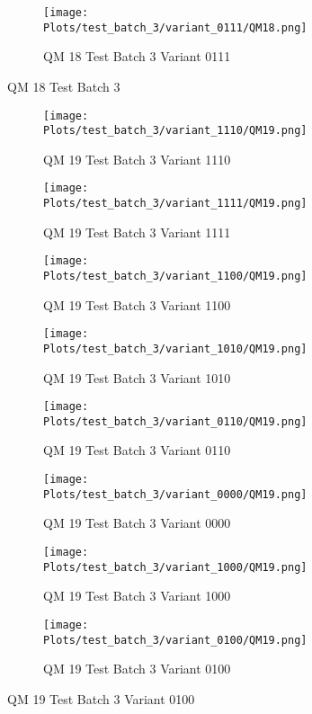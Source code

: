 \documentclass{DissertateFigs}
\begin{document}
\begin{figure}[t!]
\medskip

    \begin{subfigure}{0.47\textwidth}
    \texttt{[image: Plots/test\_batch\_3/variant\_0111/QM18.png]}
    \caption{QM 18 Test Batch 3 Variant 0111}
    \end{subfigure}
\caption{QM 18 Test Batch 3}
    \end{figure}
\clearpage
\begin{figure}[t!]
    \begin{subfigure}{0.47\textwidth}
    \texttt{[image: Plots/test\_batch\_3/variant\_1110/QM19.png]}
    \caption{QM 19 Test Batch 3 Variant 1110}
    \end{subfigure}
    \begin{subfigure}{0.47\textwidth}
    \texttt{[image: Plots/test\_batch\_3/variant\_1111/QM19.png]}
    \caption{QM 19 Test Batch 3 Variant 1111}
    \end{subfigure}

\medskip

    \begin{subfigure}{0.47\textwidth}
    \texttt{[image: Plots/test\_batch\_3/variant\_1100/QM19.png]}
    \caption{QM 19 Test Batch 3 Variant 1100}
    \end{subfigure}
    \begin{subfigure}{0.47\textwidth}
    \texttt{[image: Plots/test\_batch\_3/variant\_1010/QM19.png]}
    \caption{QM 19 Test Batch 3 Variant 1010}
    \end{subfigure}

\medskip

    \begin{subfigure}{0.47\textwidth}
    \texttt{[image: Plots/test\_batch\_3/variant\_0110/QM19.png]}
    \caption{QM 19 Test Batch 3 Variant 0110}
    \end{subfigure}
    \begin{subfigure}{0.47\textwidth}
    \texttt{[image: Plots/test\_batch\_3/variant\_0000/QM19.png]}
    \caption{QM 19 Test Batch 3 Variant 0000}
    \end{subfigure}

\medskip

    \begin{subfigure}{0.47\textwidth}
    \texttt{[image: Plots/test\_batch\_3/variant\_1000/QM19.png]}
    \caption{QM 19 Test Batch 3 Variant 1000}
    \end{subfigure}
    \begin{subfigure}{0.47\textwidth}
    \texttt{[image: Plots/test\_batch\_3/variant\_0100/QM19.png]}
    \caption{QM 19 Test Batch 3 Variant 0100}
    \end{subfigure}


\end{figure}
\end{document}
